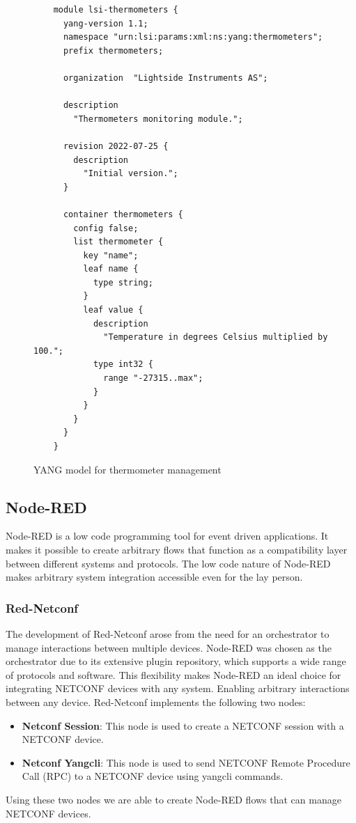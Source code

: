 \documentclass[12pt]{article}
\begin{document}
\begin{figure}
  \begin{verbatim}
    module lsi-thermometers {
      yang-version 1.1;
      namespace "urn:lsi:params:xml:ns:yang:thermometers";
      prefix thermometers;

      organization  "Lightside Instruments AS";

      description
        "Thermometers monitoring module.";

      revision 2022-07-25 {
        description
          "Initial version.";
      }

      container thermometers {
        config false;
        list thermometer {
          key "name";
          leaf name {
            type string;
          }
          leaf value {
            description
              "Temperature in degrees Celsius multiplied by 100.";
            type int32 {
              range "-27315..max";
            }
          }
        }
      }
    }
  \end{verbatim}
  \caption{YANG model for thermometer management}
  \label{fig:yang}
\end{figure}

\newpage

\subsection{Node-RED}
Node-RED is a low code programming tool for event driven applications.
It makes it possible to create arbitrary flows that function as a compatibility layer
between different systems and protocols. The low code nature of Node-RED makes arbitrary system
integration accessible even for the lay person.

\subsubsection{Red-Netconf}
The development of Red-Netconf \cite{LightsideinstrumentsRednetconf} arose from the need for an orchestrator to manage interactions between multiple devices. 
Node-RED was chosen as the orchestrator due to its extensive plugin repository, which supports a wide range of protocols and software. 
This flexibility makes Node-RED an ideal choice for integrating NETCONF devices with any system.
Enabling arbitrary interactions between any device.
Red-Netconf \cite{LightsideinstrumentsRednetconf} implements the following two 
nodes:
\begin{itemize}
  \item \textbf{Netconf Session}: This node is used to create a NETCONF session with a NETCONF device.
  \item \textbf{Netconf Yangcli}: This node is used to send NETCONF Remote Procedure Call (RPC) to a NETCONF device using yangcli commands.
\end{itemize}
Using these two nodes we are able to create Node-RED flows that can manage NETCONF devices.
\end{document}
